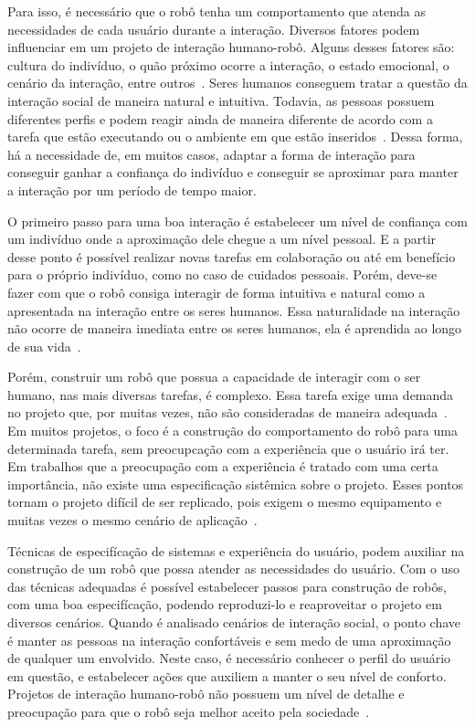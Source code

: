 Para isso, é necessário que o robô tenha um comportamento que atenda as necessidades de cada usuário durante a interação. Diversos fatores podem influenciar em um projeto de interação humano-robô. Alguns desses fatores são: cultura do indivíduo, o quão próximo ocorre a interação, o estado emocional, o cenário da interação, entre outros~\cite{hall:1969, argyle:1988, jung:1991}. Seres humanos conseguem tratar a questão da interação social de maneira natural e intuitiva. Todavia, as pessoas possuem diferentes perfis e podem reagir ainda de maneira diferente de acordo com a tarefa que estão executando ou o ambiente em que estão inseridos~\cite{jung:1991}. Dessa forma, há a necessidade de, em muitos casos, adaptar a forma de interação para conseguir ganhar a confiança do indivíduo e conseguir se aproximar para manter a interação por um período de tempo maior.

O primeiro passo para uma boa interação é estabelecer um nível de confiança com um indivíduo onde a aproximação dele chegue a um nível pessoal. E a partir desse ponto é possível realizar novas tarefas em colaboração ou até em benefício para o próprio indivíduo, como no caso de cuidados pessoais. Porém, deve-se fazer com que o robô consiga interagir de forma intuitiva e natural como a apresentada na interação entre os seres humanos. Essa naturalidade na interação não ocorre de maneira imediata entre os seres humanos, ela é aprendida ao longo de sua vida~\cite{hall:1969, argyle:1988}.

Porém, construir um robô que possua a capacidade de interagir com o ser humano, nas mais diversas tarefas, é complexo. Essa tarefa exige uma demanda no projeto que, por muitas vezes, não são consideradas de maneira adequada~\cite{alenljung:2017}. Em muitos projetos, o foco é a construção do comportamento do robô para uma determinada tarefa, sem preocupcação com a experiência que o usuário irá ter. Em trabalhos que a preocupação com a experiência é tratado com uma certa importância, não existe uma especificação sistêmica sobre o projeto. Esses pontos tornam o projeto difícil de ser replicado, pois exigem o mesmo equipamento e muitas vezes o mesmo cenário de aplicação~\cite{meerbeek:2009, ruckert:2013, alenljung:2017}.

Técnicas de especifícação de sistemas e experiência do usuário, podem auxiliar na construção de um robô que possa atender as necessidades do usuário. Com o uso das técnicas adequadas é possível estabelecer passos para construção de robôs, com uma boa especifícação, podendo reproduzi-lo e reaproveitar o projeto em diversos cenários. Quando é analisado cenários de interação social, o ponto chave é manter as pessoas na interação confortáveis e sem medo de uma aproximação de qualquer um envolvido. Neste caso, é necessário conhecer o perfil do usuário em questão, e estabelecer ações que auxiliem a manter o seu nível de conforto. Projetos de interação humano-robô não possuem um nível de detalhe e preocupação para que o robô seja melhor aceito pela sociedade~\cite{alenljung:2017}.

